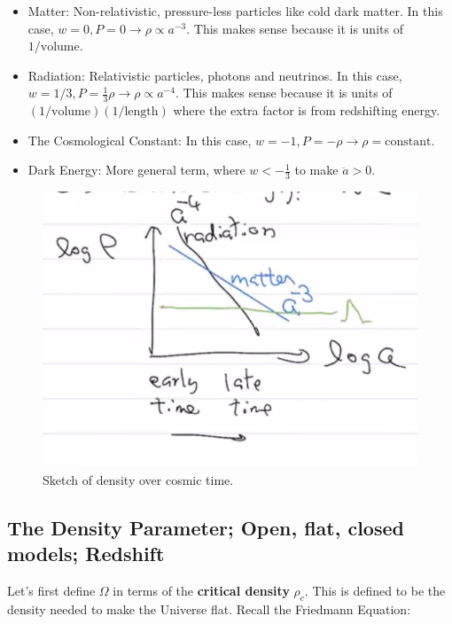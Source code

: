 \documentclass{article}
\begin{document}
\begin{itemize}
    \item Matter: Non-relativistic, pressure-less particles like cold dark matter. In this case, $w = 0, P = 0 \rightarrow \boxed{\rho \propto a^{-3}}$. This makes sense because it is units of $1/\text{volume}$.
    \item Radiation: Relativistic particles, photons and neutrinos. In this case, $w = 1/3, P = \frac13 \rho \rightarrow \boxed{\rho \propto a^{-4}}$. This makes sense because it is units of $\left(1/\text{volume}\right)\left(1/\text{length}\right) $ where the extra factor is from redshifting energy.
    \item The Cosmological Constant: In this case, $w = -1, P=-\rho \rightarrow \rho = \text{constant}$.
    \item Dark Energy: More general term, where $w < -\frac13$ to make $\ddot{a} >0$.
\end{itemize}

\begin{figure}
    \centering
    \includegraphics{density.png}
    \caption{Sketch of density over cosmic time. }
    \label{fig:density}
\end{figure}

\subsection{The Density Parameter; Open, flat, closed models; Redshift}

Let's first define $\Omega$ in terms of the \textbf{critical density} $\rho_c$. This is defined to be the density needed to make the Universe flat. Recall the Friedmann Equation:
\end{document}
